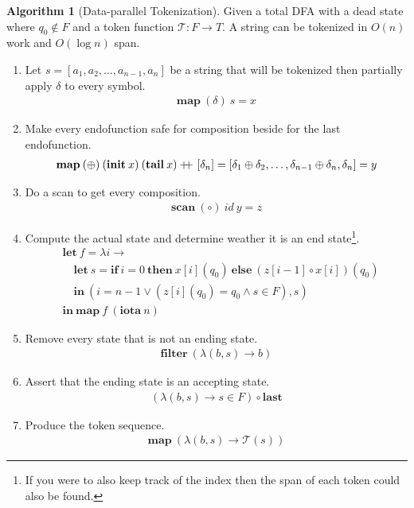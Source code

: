 \documentclass[a4paper,12pt]{article}
\theoremstyle{definition}
\newtheorem{algorithm}{Algorithm}[section]
\newcommand\doubleplus{+\kern-1.3ex+\kern0.8ex}
\begin{document}
\begin{algorithm}[Data-parallel Tokenization]\label{algo:token}
  Given a total DFA with a dead state where $q_0 \notin F$ and a token function $\mathcal{T}: F \to T$. A string can be tokenized in $O(n)$ work and $O(\log n)$ span.
  \begin{enumerate}
    \item Let $s = [a_1, a_2, \dots, a_{n - 1}, a_n]$ be a string that will be tokenized then partially apply $\delta$ to every symbol. 
    \begin{align*}
      \mathbf{map} \: (\delta) \: s = x
    \end{align*}
    \item Make every endofunction safe for composition beside for the last endofunction.
    \begin{align*}
      \mathbf{map} \: (\oplus) \: (\mathbf{init} \:x) \: (\mathbf{tail} \: x) \doubleplus [\delta_n] = [\delta_1 \oplus \delta_2, \dots, \delta_{n - 1} \oplus \delta_n, \delta_n] = y
    \end{align*}
    \item Do a scan to get every composition.
    \begin{align*}
      \mathbf{scan} \: (\circ) \: id \: y = z
    \end{align*}
    \item Compute the actual state and determine weather it is an end state\footnote{If you were to also keep track of the index then the span of each token could also be found.}.
    \begin{align*}
      & \mathbf{let} \: f = \lambda i \to \\
      & \quad \mathbf{let} \: s = \mathbf{if} \: i = 0 \: \mathbf{then} \: x[i](q_0) \: \mathbf{else} \: (z[i - 1] \circ x[i])(q_0) \\
      & \quad \mathbf{in} \: (i = n - 1 \lor (z[i](q_0) = q_0 \land s \in F), s) \\
      & \mathbf{in} \: \mathbf{map} \: f \: (\mathbf{iota} \: n)
    \end{align*}
    \item Remove every state that is not an ending state.
    \begin{align*}
      \mathbf{filter} \: (\lambda(b, s) \to b)
    \end{align*}
    \item Assert that the ending state is an accepting state.
    \begin{align*}
       (\lambda(b, s) \to s \in F) \circ \mathbf{last}
    \end{align*}
    \item Produce the token sequence.
    \begin{align*}
      \mathbf{map} \: (\lambda(b, s) \to \mathcal{T}(s))
    \end{align*}
  \end{enumerate}
\end{algorithm}
\end{document}
